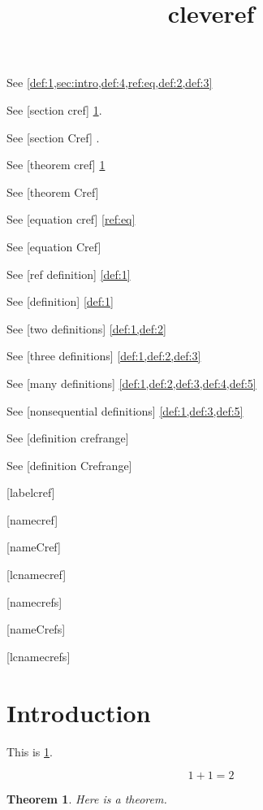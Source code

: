 \documentclass{amsart}
\title{cleveref}
\newtheorem{theorem}{Theorem}
\begin{document}
\maketitle

See \cref{def:1,sec:intro,def:4,ref:eq,def:2,def:3} 

See [section cref] \cref{sec:intro}.

See [section Cref] .

See [theorem cref] \cref{thm:1}

See [theorem Cref] 

See [equation cref] \cref{ref:eq}

See [equation Cref] 

See [ref definition] \ref{def:1}

See [definition] \cref{def:1}

See [two definitions] \cref{def:1,def:2}

See [three definitions] \cref{def:1,def:2,def:3}

See [many definitions] \cref{def:1,def:2,def:3,def:4,def:5}

See [nonsequential definitions] \cref{def:1,def:3,def:5}

See [definition crefrange] 

See [definition Crefrange] 

[labelcref] 

[namecref] 

[nameCref] 

[lcnamecref] 

[namecrefs] 

[nameCrefs] 

[lcnamecrefs] 

\section{Introduction}
\label{sec:intro}

This is \cref{sec:intro}.

\begin{equation}
\label{ref:eq}
1 + 1 = 2
\end{equation}

\begin{theorem}\label{thm:1}
Here is a theorem.
\end{theorem}
\end{document}
